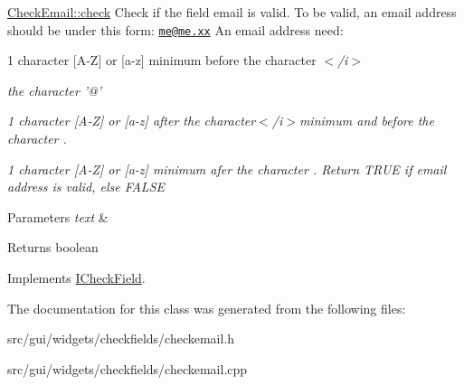 \hyperlink{classCheckEmail_a544d7656d36bd463391fe2f4dd3e13c6}{Check\+Email\+::check} Check if the field email is valid. To be valid, an email address should be under this form\+: \href{mailto:me@me.xx}{\tt me@me.\+xx} An email address need\+: 


\begin{DoxyItemize}
\item 1 character \mbox{[}A-\/\+Z\mbox{]} or \mbox{[}a-\/z\mbox{]} minimum before the character {\itshape $<$/i$>$}
\item {\itshape the character '@'}
\item {\itshape 1 character \mbox{[}A-\/\+Z\mbox{]} or \mbox{[}a-\/z\mbox{]} after the character{\itshape $<$/i$>$minimum and before the character {\itshape .}}}
\item {\itshape {\itshape 1 character \mbox{[}A-\/\+Z\mbox{]} or \mbox{[}a-\/z\mbox{]} minimum afer the character {\itshape .} Return T\+R\+U\+E if email address is valid, else F\+A\+L\+S\+E 
\begin{DoxyParams}{Parameters}
{\em text} & \\
\hline
\end{DoxyParams}
\begin{DoxyReturn}{Returns}
boolean 
\end{DoxyReturn}
}}
\end{DoxyItemize}

Implements \hyperlink{classICheckField_a6bd42b4d49c165cdd92822135123fd4b}{I\+Check\+Field}.



The documentation for this class was generated from the following files\+:\begin{DoxyCompactItemize}
\item 
src/gui/widgets/checkfields/checkemail.\+h\item 
src/gui/widgets/checkfields/checkemail.\+cpp\end{DoxyCompactItemize}
